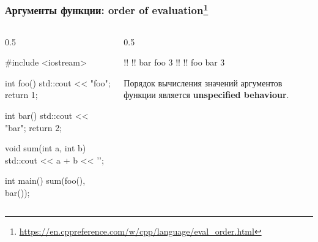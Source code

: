 \documentclass[compress, 8pt, aspectratio=169]{beamer}
\begin{document}
\begin{frame}[fragile]

    \frametitle{Аргументы функции: order of evaluation\footnote{\url{https://en.cppreference.com/w/cpp/language/eval\_order.html}}}

    \begin{columns}[T]

        \begin{column}{0.5\textwidth}

            \begin{myinplacelisting}[minted language=cpp]
#include <iostream>

int foo() {
    std::cout << "foo\n";
    return 1;
}

int bar() {
    std::cout << "bar\n";
    return 2;
}

void sum(int a, int b) {
    std::cout << a + b
        << '\n';
}

int main() {
    sum(foo(), bar());
}
            \end{myinplacelisting}

        \end{column}

        \begin{column}{0.5\textwidth}

            \begin{terminalwindow}
!!
!!
bar
foo
3
!!
!!
foo
bar
3
            \end{terminalwindow}

            Порядок вычисления значений аргументов функции является
            \textbf{unspecified behaviour}\footnotemark{}.


        \end{column}

    \end{columns}
    
\end{frame}
\end{document}
